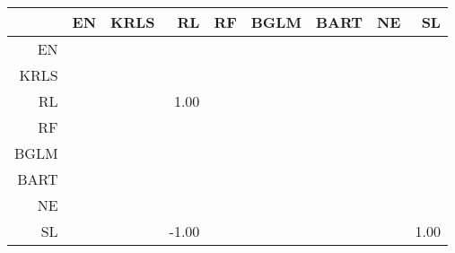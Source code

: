 \begin{table}[ht]
\centering
\begin{tabular}{rrrrrrrrr}
  \hline
 & EN & KRLS & RL & RF & BGLM & BART & NE & SL \\ 
  \hline
EN &  &  &  &  &  &  &  &  \\ 
  KRLS &  &  &  &  &  &  &  &  \\ 
  RL &  &  & 1.00 &  &  &  &  &  \\ 
  RF &  &  &  &  &  &  &  &  \\ 
  BGLM &  &  &  &  &  &  &  &  \\ 
  BART &  &  &  &  &  &  &  &  \\ 
  NE &  &  &  &  &  &  &  &  \\ 
  SL &  &  & -1.00 &  &  &  &  & 1.00 \\ 
   \hline
\end{tabular}
\end{table}
